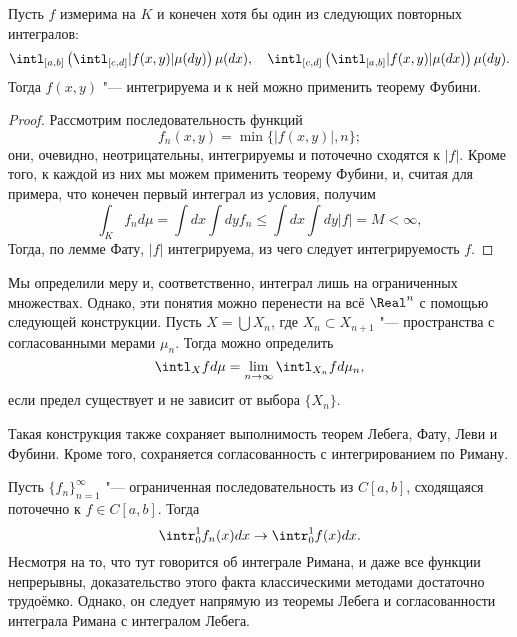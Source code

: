 \documentclass[main]{subfiles}
\begin{document}
\begin{corollary}
  Пусть \( f \) измерима на \( K \)
  и конечен хотя бы
  один из следующих повторных интегралов:
  \[
    \intl_{[a, b]} \left( \intl_{[c, d]} |f(x, y)| \mu(dy) \right) \mu(dx),
    \quad
    \intl_{[c, d]} \left( \intl_{[a, b]} |f(x, y)| \mu(dx) \right) \mu(dy).
  \]
  Тогда \( f(x, y) \) "--- интегрируема
  и к ней можно применить теорему Фубини.
\end{corollary}
\begin{proof}
  Рассмотрим последовательность функций
  \[
    f_n(x, y) = \min \{ |f(x, y)|, n \};
  \]
  они, очевидно, неотрицательны, интегрируемы 
  и поточечно сходятся к \( |f| \). Кроме того,
  к каждой из них мы можем применить теорему Фубини,
  и, считая для примера,
  что конечен первый интеграл из условия,
  получим
  \[
    \int_K f_n d \mu =
    \int dx \int dy f_n \le \int dx \int dy |f| = M < \infty,
  \]
  Тогда, по лемме Фату, \( |f| \) интегрируема,
  из чего следует интегрируемость \( f \).
\end{proof}

Мы определили меру и, соответственно, интеграл
лишь на ограниченных множествах.
Однако, эти понятия можно перенести
на всё \( \Real^n \) с помощью следующей конструкции.
Пусть \( X = \bigcup X_n \), где
\( X_n \subset X_{n+1} \) "--- пространства
с согласованными мерами \( \mu_n \).
Тогда можно определить
\[
  \intl_X f d\mu = \lim_{n \to \infty} \intl_{X_n} f d\mu_n,
\]
если предел существует и не зависит от выбора \( \{ X_n \} \).

\begin{remark}
  Такая конструкция также сохраняет выполнимость теорем
  Лебега, Фату, Леви и Фубини.
  Кроме того, сохраняется согласованность
  с интегрированием по Риману.
\end{remark}

\begin{example}
  Пусть \( \{ f_n \}_{n=1}^\infty \) "---
  ограниченная последовательность из \( C[a, b] \),
  сходящаяся поточечно к \( f \in C[a, b] \).
  Тогда
  \[
    \intr_0^1 f_n(x) dx \to \intr_0^1 f(x) dx.
  \]
  Несмотря на то, что тут говорится об интеграле
  Римана, и даже все функции непрерывны,
  доказательство этого факта классическими методами
  достаточно трудоёмко.
  Однако, он следует напрямую из теоремы Лебега
  и согласованности интеграла Римана с интегралом Лебега.
\end{example}
\end{document}
